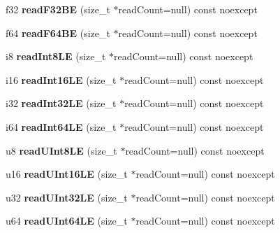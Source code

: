 \begin{DoxyCompactItemize}
f32 {\bfseries read\+F32\+BE} (size\+\_\+t $\ast$read\+Count=null) const noexcept
\item 
\mbox{\label{class_binary_reader_ae1209fb101ec277549544e1d9f07d784}} 
f64 {\bfseries read\+F64\+BE} (size\+\_\+t $\ast$read\+Count=null) const noexcept
\item 
\mbox{\label{class_binary_reader_a7b50df971513ae0f3357aaaed1d8b8cc}} 
i8 {\bfseries read\+Int8\+LE} (size\+\_\+t $\ast$read\+Count=null) const noexcept
\item 
\mbox{\label{class_binary_reader_abe384cb8fb7ba6fc21739aeabf9310ff}} 
i16 {\bfseries read\+Int16\+LE} (size\+\_\+t $\ast$read\+Count=null) const noexcept
\item 
\mbox{\label{class_binary_reader_ad284768145310fb0506a35d5b50312ec}} 
i32 {\bfseries read\+Int32\+LE} (size\+\_\+t $\ast$read\+Count=null) const noexcept
\item 
\mbox{\label{class_binary_reader_a68c8f031d4bae4ba3f6153b639b9d6c6}} 
i64 {\bfseries read\+Int64\+LE} (size\+\_\+t $\ast$read\+Count=null) const noexcept
\item 
\mbox{\label{class_binary_reader_ad53ff561833d58a8d43740bc937035b6}} 
u8 {\bfseries read\+U\+Int8\+LE} (size\+\_\+t $\ast$read\+Count=null) const noexcept
\item 
\mbox{\label{class_binary_reader_acd2c0ee5a7b3b17e86124f34a7bcdf11}} 
u16 {\bfseries read\+U\+Int16\+LE} (size\+\_\+t $\ast$read\+Count=null) const noexcept
\item 
\mbox{\label{class_binary_reader_ac55fefb57e52ac273d3c12bd4d2b266b}} 
u32 {\bfseries read\+U\+Int32\+LE} (size\+\_\+t $\ast$read\+Count=null) const noexcept
\item 
\mbox{\label{class_binary_reader_a48bb5679441d9bdbb04b69fddffcc5e6}} 
u64 {\bfseries read\+U\+Int64\+LE} (size\+\_\+t $\ast$read\+Count=null) const noexcept
\item 
\mbox{\label{class_binary_reader_a1597c56485b0ebeaae9d564deb84cbd6}} 

\end{DoxyCompactItemize}
